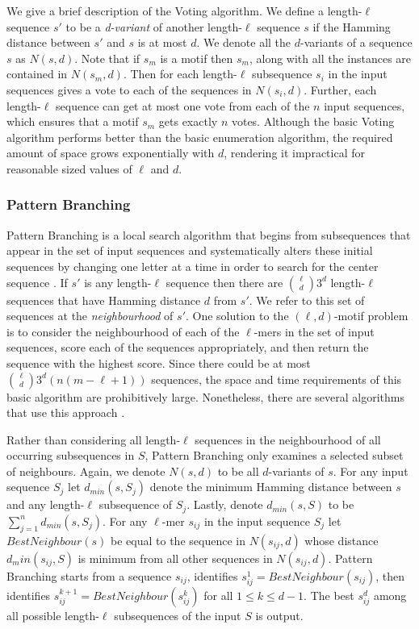 We give a brief description of the Voting algorithm.  We define a length-$\ell$ sequence $s'$ to be a {\em d-variant} of another length-$\ell$ sequence $s$ if the Hamming distance between $s'$ and $s$ is at most $d$.  We denote all the $d$-variants of a sequence $s$ as $N(s,d)$.  Note that if $s_m$ is a motif then $s_m$, along with all the instances are contained in $N(s_m, d)$.  Then for each length-$\ell$ subsequence $s_i$ in the input sequences gives a vote to each of the sequences in $N(s_i, d)$. Further, each length-$\ell$ sequence can get at most one vote from each of the $n$ input sequences, which ensures that a motif $s_m$ gets exactly $n$ votes. Although the basic Voting algorithm performs better than the basic enumeration algorithm, the required amount of space grows exponentially with $d$, rendering it impractical for reasonable sized values of $\ell$ and $d$.   

\subsubsection{Pattern Branching}

Pattern Branching is a local search algorithm that begins from subsequences that appear in the set of input sequences and systematically alters these initial sequences by changing one letter at a time in order to search for the center sequence \cite{patternbranching}.  If $s'$ is any length-$\ell$ sequence then there are ${{\ell}\choose{d}}3^d$ length-$\ell$ sequences that have Hamming distance $d$ from $s'$.  We refer to this set of sequences at the {\em neighbourhood} of $s'$.  One solution to the $(\ell, d)$-motif problem is to consider the neighbourhood of each of the $\ell$-mers in the set of input sequences, score each of the sequences appropriately, and then return the sequence with the highest score.  Since there could be at most ${{\ell}\choose{d}}3^d (n(m - \ell + 1))$ sequences, the space and time requirements of this basic algorithm are prohibitively large.  Nonetheless, there are several algorithms that use this approach \cite{GEW85,WAG84}.

Rather than considering all length-$\ell$ sequences in the neighbourhood of all occurring subsequences in $S$, Pattern Branching  only examines a selected subset of neighbours.  Again, we denote $N(s, d)$ to be all $d$-variants of $s$.  For any input sequence $S_j$ let $d_{min}(s, S_j)$ denote the minimum Hamming distance between $s$ and any length-$\ell$ subsequence of $S_j$.  Lastly, denote $d_{min}(s, S)$ to be $\sum_{j=1}^nd_{min}(s, S_j)$.  For any $\ell$-mer $s_{ij}$ in the input sequence $S_j$ let $BestNeighbour(s)$ be equal to the sequence in $N(s_{ij}, d)$ whose distance $d_min(s_{ij}, S)$ is minimum from all other sequences in $N(s_{ij}, d)$.  Pattern Branching starts from a sequence $s_{ij}$, identifies $s_{ij}^1 = BestNeighbour(s_{ij})$, then identifies $s_{ij}^{k + 1} = BestNeighbour(s_{ij}^{k})$ for all $1 \leq k \leq d - 1$. The best $s_{ij}^d$ among all possible length-$\ell$ subsequences of the input $S$ is output.

